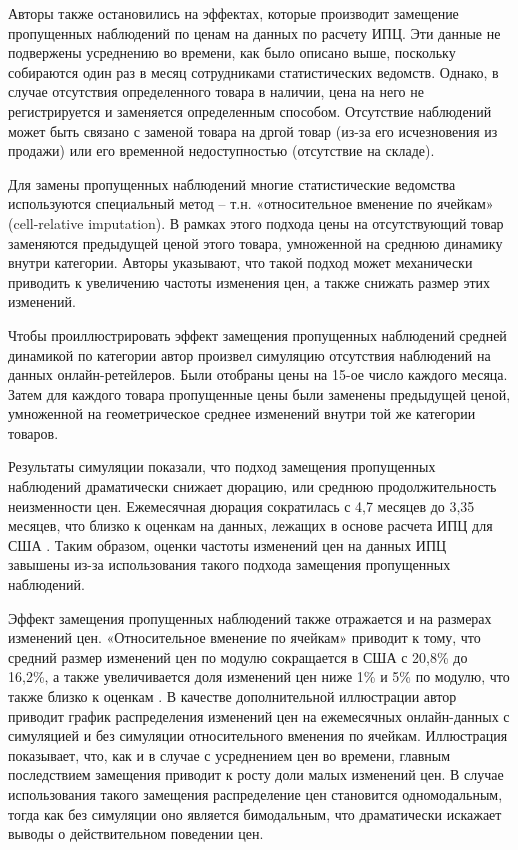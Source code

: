 Авторы также остановились на эффектах, которые производит замещение пропущенных наблюдений по ценам на данных по расчету ИПЦ. Эти данные не подвержены усреднению во времени, как было описано выше, поскольку собираются один раз в месяц сотрудниками статистических ведомств. Однако, в случае отсутствия определенного товара в наличии, цена на него не регистрируется и заменяется определенным способом. Отсутствие наблюдений может быть связано с заменой товара на дргой товар (из-за его исчезновения из продажи) или его временной недоступностью (отсутствие на складе). 

Для замены пропущенных наблюдений многие статистические ведомства используются специальный метод – т.н. «относительное вменение по ячейкам» (cell-relative imputation). В рамках этого подхода цены на отсутствующий товар заменяются предыдущей ценой этого товара, умноженной на среднюю динамику внутри категории. Авторы указывают, что такой подход может механически приводить к увеличению частоты изменения цен, а также снижать размер этих изменений.

Чтобы проиллюстрировать эффект замещения пропущенных наблюдений средней динамикой по категории автор произвел симуляцию отсутствия наблюдений на данных онлайн-ретейлеров. Были отобраны цены на 15-ое число каждого месяца. Затем для каждого товара пропущенные цены были заменены предыдущей ценой, умноженной на геометрическое среднее изменений внутри той же категории товаров.

Результаты симуляции показали, что подход замещения пропущенных наблюдений драматически снижает дюрацию, или среднюю продолжительность неизменности цен. Ежемесячная дюрация сократилась с 4,7 месяцев до 3,35 месяцев, что близко к оценкам на данных, лежащих в основе расчета ИПЦ для США \cite{KlenowKryvtsov2008}. Таким образом, оценки частоты изменений цен на данных ИПЦ завышены из-за использования такого подхода замещения пропущенных наблюдений.

Эффект замещения пропущенных наблюдений также отражается и на размерах изменений цен. «Относительное вменение по ячейкам» приводит к тому, что средний размер изменений цен по модулю сокращается в США с 20,8\% до 16,2\%, а также увеличивается доля изменений цен ниже 1\% и 5\% по модулю, что также близко к оценкам \cite{KlenowKryvtsov2008}. В качестве дополнительной иллюстрации автор приводит график распределения изменений цен на ежемесячных онлайн-данных с симуляцией и без симуляции относительного вменения по ячейкам. Иллюстрация показывает, что, как и в случае с усреднением цен во времени, главным последствием замещения приводит к росту доли малых изменений цен. В случае использования такого замещения распределение цен становится одномодальным, тогда как без симуляции оно является бимодальным, что драматически искажает выводы о действительном поведении цен.

